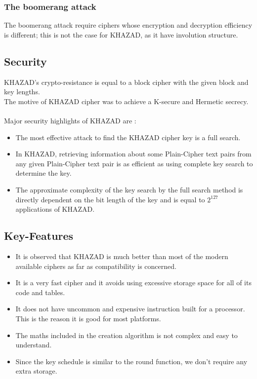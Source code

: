 \documentclass[preprint]{transcrypto}
\begin{document}
\subsubsection{The boomerang attack}\cite{2}
The boomerang attack require ciphers whose encryption and decryption efficiency is different; this is not the case for KHAZAD, as it have
involution structure.

\subsection{Security}
KHAZAD's crypto-resistance is equal to a block cipher with the given block and key lengths. \\
The motive of KHAZAD cipher was to achieve a K-secure and Hermetic secrecy.\\\\
Major security highlights of KHAZAD are :
\begin{itemize}
    \item The most effective attack to find the KHAZAD cipher key is a full search.
    \item In KHAZAD, retrieving information about some Plain-Cipher text pairs from any given Plain-Cipher text pair is as efficient as using complete key search to determine the key.
    \item The approximate complexity of the key search by the full search method is directly dependent on the bit length of the key and is equal to $2^{127}$ applications of KHAZAD. \\
    
\end{itemize}
\subsection{Key-Features}
\begin{itemize}
    \item It is observed that KHAZAD is much better than most of the modern available ciphers as far as compatibility is concerned.
    \item It is a very fast cipher and it avoids using excessive storage space for all of its code and tables.
    \item It does not have uncommon and expensive instruction built for a processor. This is the reason it is good for most platforms.
    \item The maths included in the creation algorithm is not complex and easy to understand.
    \item Since the key schedule is similar to the round function, we don't require any extra storage.
\end{itemize}
\end{document}
